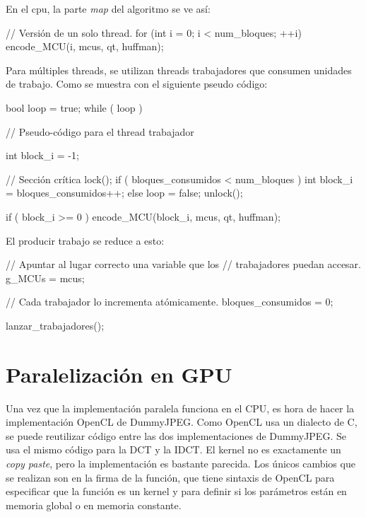 En el cpu, la parte \emph{map} del algoritmo se ve así:

\begin{code}[language=C][h]
    // Versión de un solo thread.
    for (int i = 0; i < num_bloques; ++i) {
        encode_MCU(i, mcus, qt, huffman);
    }
\end{code}

Para múltiples threads, se utilizan threads trabajadores que consumen unidades
de trabajo. Como se muestra con el siguiente pseudo código:

\begin{code}[language=C][h]
    bool loop = true;
    while ( loop ) {
        // Pseudo-código para el thread trabajador

        int block_i = -1;

        // Sección crítica
        lock();
        if ( bloques_consumidos < num_bloques ) {
            int block_i = bloques_consumidos++;
        } else {
            loop = false;
        }
        unlock();

        if ( block_i >= 0 ) {
            encode_MCU(block_i, mcus, qt, huffman);
        }
    }
\end{code}

El producir trabajo se reduce a esto:

\begin{code}[language=C][h]
    // Apuntar al lugar correcto una variable que los
    // trabajadores puedan accesar.
    g_MCUs = mcus;

    // Cada trabajador lo incrementa atómicamente.
    bloques_consumidos = 0;

    lanzar_trabajadores();
\end{code}

\section{Paralelización en GPU}

Una vez que la implementación paralela funciona en el CPU, es hora de hacer la
implementación OpenCL de DummyJPEG. Como OpenCL usa un dialecto de C, se puede
reutilizar código entre las dos implementaciones de DummyJPEG. Se usa el mismo
código para la DCT y la IDCT. El kernel no es exactamente un \emph{copy paste},
pero la implementación es bastante parecida. Los únicos cambios que se realizan
son en la firma de la función, que tiene sintaxis de OpenCL para especificar
que la función es un kernel y para definir si los parámetros están en memoria
global o en memoria constante.

